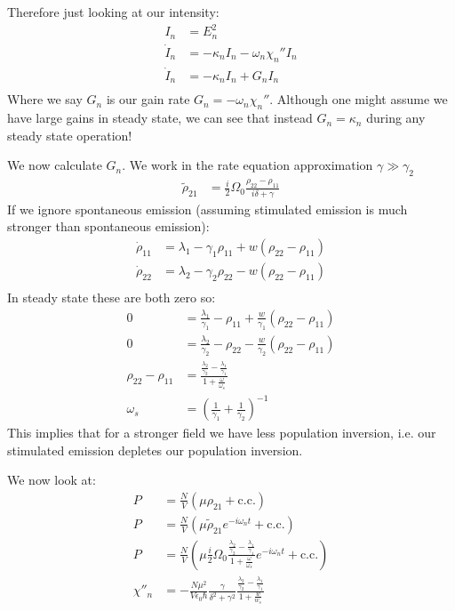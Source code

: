 Therefore just looking at our intensity:
\begin{align*}
	I_n &= E_n^2 \\
	\dot{I}_n &= -\kappa_n I_n -\omega_n\chi_n''I_n \\
	\dot{I}_n &= -\kappa_n I_n +G_n I_n \\
\end{align*}
Where we say $G_n$ is our gain rate $G_n = -\omega_n\chi_n''$. Although one might assume we have large gains in steady state, we can see that instead $G_n = \kappa_n$ during any steady state operation!

We now calculate $G_n$. We work in the rate equation approximation $\gamma\gg\gamma_2$
\begin{align*}
	\tilde{\rho}_{21} &= \frac{i}{2}\Omega_0 \frac{\rho_{22} - \rho_{11}}{i\delta + \gamma}
\end{align*}
If we ignore spontaneous emission (assuming stimulated emission is much stronger than spontaneous emission):
\begin{align*}
	\dot{\rho}_{11} &= \lambda_1 - \gamma_1\rho_{11} + w(\rho_{22} - \rho_{11}) \\
	\dot{\rho}_{22} &= \lambda_2 - \gamma_2\rho_{22} - w(\rho_{22} - \rho_{11}) \\
\end{align*}
In steady state these are both zero so:
\begin{align*}
	0 &= \frac{\lambda_1}{\gamma_1} - \rho_{11} + \frac{w}{\gamma_1}(\rho_{22} - \rho_{11}) \\
	0 &= \frac{\lambda_2}{\gamma_2} - \rho_{22} - \frac{w}{\gamma_2}(\rho_{22} - \rho_{11}) \\
	\rho_{22} - \rho_{11} &= \frac{\frac{\lambda_2}{\gamma_2} - \frac{\lambda_1}{\gamma_1}}{1 + \frac{\omega}{\omega_s}} \\
	\omega_s &= \left(\frac{1}{\gamma_1} + \frac{1}{\gamma_2}\right)^{-1}
\end{align*}
This implies that for a stronger field we have less population inversion, i.e. our stimulated emission depletes our population inversion.

We now look at:
\begin{align*}
	P &= \frac{N}{V}(\mu\rho_{21} + \text{c.c.}) \\
	P &= \frac{N}{V}(\mu\tilde{\rho}_{21}e^{-i\omega_n t} + \text{c.c.}) \\
	P &= \frac{N}{V}(\mu \frac{i}{2}\Omega_0\frac{\frac{\lambda_2}{\gamma_2} - \frac{\lambda_1}{\gamma_1}}{1 + \frac{\omega}{\omega_s}} e^{-i\omega_n t} + \text{c.c.}) \\
	\chi''_n &= -\frac{N\mu^2}{V\epsilon_0\hbar} \frac{\gamma}{\delta^2+\gamma^2} \frac{\frac{\lambda_2}{\gamma_2} - \frac{\lambda_1}{\gamma_1}}{1 + \frac{w}{w_s}}
\end{align*}
